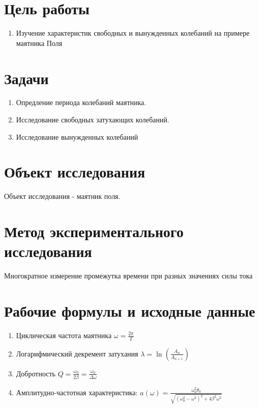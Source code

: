 \section{Цель работы}
\begin{enumerate}
	\item Изучение характеристик свободных и вынужденных колебаний на примере маятника Поля
\end{enumerate}

\section{Задачи}
\begin{enumerate}
	\item Опредление периода колебаний маятника.
	\item Исследование свободных затухающих колебаний.
	\item Исследование вынужденных колебаний
\end{enumerate}

\section{Объект исследования}
Объект исследования - маятник поля.

\section{Метод экспериментального исследования}
Многократное измерение промежутка времени при разных значениях силы тока

\section{Рабочие формулы и исходные данные}
\begin{enumerate}
	\item Циклическая частота маятника $\omega = \frac{2\pi}{T}$
	\item Логарифмический декремент затухания $\lambda = \ln \left( \frac{A_n}{A_{n+1}} \right)$
	\item Добротность $Q = \frac{\omega_0}{2 \beta} = \frac{\omega_0}{\Delta \omega}$
	\item Амплитудно-частотная характеристика:
	      $ a(\omega) = \frac{\omega_0^2 \theta_0}{\sqrt{(\omega_0^2 - \omega^2)^2 + 4 \beta^2 \omega^2}} $
\end{enumerate}


